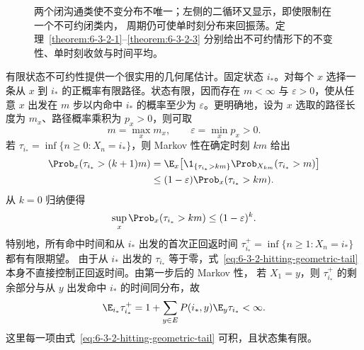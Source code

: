 \begin{figure}[htbp]
\centering
{}
\caption{两个闭沟通类使不变分布不唯一；左侧的二循环又显示，即使限制在一个不可约闭类内，
周期仍可使单时刻分布来回振荡。定理~\ref{theorem:6-3-2-1}--\ref{theorem:6-3-2-3}
分别给出不可约情形下的不变性、单时刻收敛与时间平均。}
\label{fig:6-3-2-classes-period}
\end{figure}

有限状态不可约性提供一个很实用的几何尾估计。固定状态 $i_*$。对每个 $x$ 选择一条从 $x$
到 $i_*$ 的正概率有限路径。状态有限，因而存在 $m<\infty$ 与 $\varepsilon>0$，使从任意 $x$
出发在 $m$ 步以内命中 $i_*$ 的概率至少为 $\varepsilon$。更明确地，设为 $x$ 选取的路径长度为
$m_x$、路径概率乘积为 $p_x>0$，则可取
\[
 m=\max_xm_x,\qquad \varepsilon=\min_xp_x>0.
\]
若 $\tau_{i_*}=\inf\{n\geq0:X_n=i_*\}$，则 Markov 性在确定时刻 $km$ 给出
\begin{align*}
 \Prob_x(\tau_{i_*}>(k+1)m)
 &=\E_x\!\left[
   \1_{\{\tau_{i_*}>km\}}
   \Prob_{X_{km}}(\tau_{i_*}>m)
   \right]\\
 &\le(1-\varepsilon)\Prob_x(\tau_{i_*}>km).
\end{align*}
从 $k=0$ 归纳便得
\begin{equation}\label{eq:6-3-2-hitting-geometric-tail}
 \sup_x\Prob_x(\tau_{i_*}>km)\leq(1-\varepsilon)^k.
\end{equation}
特别地，所有命中时间和从 $i_*$ 出发的首次正回返时间
$\tau_{i_*}^+=\inf\{n\geq1:X_n=i_*\}$ 都有有限期望。
由于从 $i_*$ 出发的 $\tau_{i_*}$ 等于零，式~\eqref{eq:6-3-2-hitting-geometric-tail}
本身不直接控制正回返时间。由第一步后的 Markov 性，
若 $X_1=y$，则 $\tau_{i_*}^+$ 的剩余部分与从 $y$ 出发命中 $i_*$ 的时间同分布，故
\[
 \E_{i_*}\tau_{i_*}^+
 =1+\sum_{y\in E}P(i_*,y)\E_y\tau_{i_*}<\infty.
\]
这里每一项由式~\eqref{eq:6-3-2-hitting-geometric-tail} 可积，且状态集有限。


